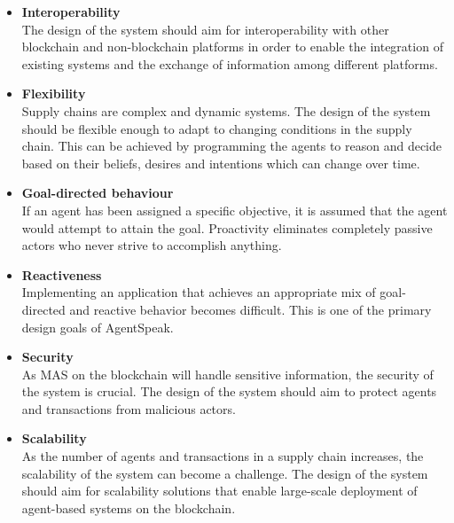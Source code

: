 \begin{itemize}
    \vspace{.5cm}

    \item \textbf{Interoperability} \\ The design of the system should aim for interoperability with other blockchain and non-blockchain platforms in order to enable the integration of existing systems and the exchange of information among different platforms.

    \vspace{.5cm}
    
    \item \textbf{Flexibility} \\
    Supply chains are complex and dynamic systems. The design of the system should be flexible enough to adapt to changing conditions in the supply chain. This can be achieved by programming the agents to reason and decide based on their beliefs, desires and intentions which can change over time.
    
    \vspace{.5cm}
    
    \item \textbf{Goal-directed behaviour} \\
    If an agent has been assigned a specific objective, it is assumed that the agent would attempt to attain the goal. Proactivity eliminates completely passive actors who never strive to accomplish anything.

    \vspace{.5cm}
    
    \item \textbf{Reactiveness} \\
    Implementing an application that achieves an appropriate mix of goal-directed and reactive behavior becomes difficult. This is one of the primary design goals of AgentSpeak.
    
    \vspace{.5cm}
    
    \item \textbf{Security} \\
    As \ac{MAS} on the blockchain will handle sensitive information, the security of the system is crucial. The design of the system should aim to protect agents and transactions from malicious actors.

    \vspace{.5cm}
    
    \item \textbf{Scalability} \\ As the number of agents and transactions in a supply chain increases, the scalability of the system can become a challenge. The design of the system should aim for scalability solutions that enable large-scale deployment of agent-based systems on the blockchain.
\end{itemize}

